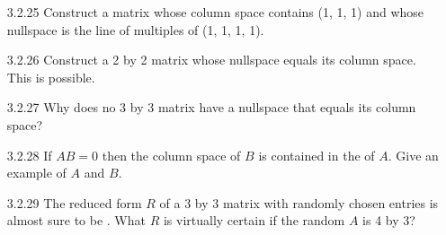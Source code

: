 \documentclass[10pt,twoside,reqno]{article}
\begin{document}
\begin{enumerate}
\item[3.2.25] Construct a matrix whose column space contains (1, 1, 1) and whose nullspace is the line of multiples of (1, 1, 1, 1).\\
\vspace{3mm}



\item[3.2.26] Construct a 2 by 2 matrix whose nullspace equals its column space. This is possible. \\
\vspace{3mm}



\item[3.2.27] Why does no 3 by 3 matrix have a nullspace that equals its column space? \\
\vspace{3mm}



\item[3.2.28] If $AB = 0$ then the column space of $B$ is contained in the \underline{\hspace{8mm}} of $A$. Give an example of $A$ and $B$. \\
\vspace{3mm}



\item[3.2.29] The reduced form $R$ of a 3 by 3 matrix with randomly chosen entries is almost sure to be \underline{\hspace{8mm}}. What $R$ is virtually certain if the random $A$ is 4 by 3? \\
\vspace{3mm}



\end{enumerate}
\vspace{5mm}
\end{document}
